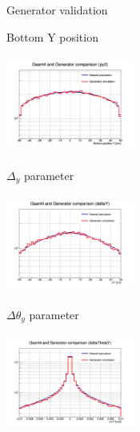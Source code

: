 \documentclass[8 pt]{beamer}
\begin{document}
\begin{frame}{Generator validation}
\begin{minipage}[c]{.32\textwidth}
\begin{exampleblock}{} \begin{center}Bottom Y position\end{center} \end{exampleblock}
\includegraphics[width=4.2cm, height=3.2cm]{figs/py2-17p2vs17p2.png} 
\end{minipage}
\begin{minipage}[c]{.32\textwidth}
\begin{exampleblock}{} \begin{center}$\Delta_y$ parameter\end{center} \end{exampleblock}
\includegraphics[width=4.2cm, height=3.2cm]{figs/deltaY-17p2vs17p2.png}
\end{minipage}
\begin{minipage}[c]{.32\textwidth}
\begin{exampleblock}{} \begin{center}$\Delta \theta_y$ parameter\end{center} \end{exampleblock}
\includegraphics[width=4.2cm, height=3.2cm]{figs/deltaThetaY-17p2vs17p2.png}
\end{minipage} \vfill
\end{frame}
\end{document}
